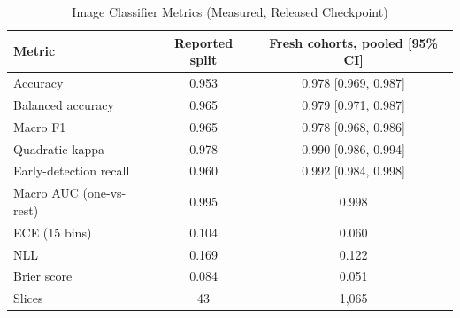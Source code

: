 \begin{table}[t]
\centering
\caption{Image Classifier Metrics (Measured, Released Checkpoint)}
\label{tab:mri}
\footnotesize
\begin{tabular}{@{}lcc@{}}
\toprule
Metric & Reported split & Fresh cohorts, pooled [95\% CI] \\
\midrule
Accuracy & 0.953 & 0.978 [0.969, 0.987] \\
Balanced accuracy & 0.965 & 0.979 [0.971, 0.987] \\
Macro F1 & 0.965 & 0.978 [0.968, 0.986] \\
Quadratic kappa & 0.978 & 0.990 [0.986, 0.994] \\
Early-detection recall & 0.960 & 0.992 [0.984, 0.998] \\
Macro AUC (one-vs-rest) & 0.995 & 0.998 \\
ECE (15 bins) & 0.104 & 0.060 \\
NLL & 0.169 & 0.122 \\
Brier score & 0.084 & 0.051 \\
Slices & 43 & 1,065 \\
\bottomrule
\end{tabular}
\end{table}
